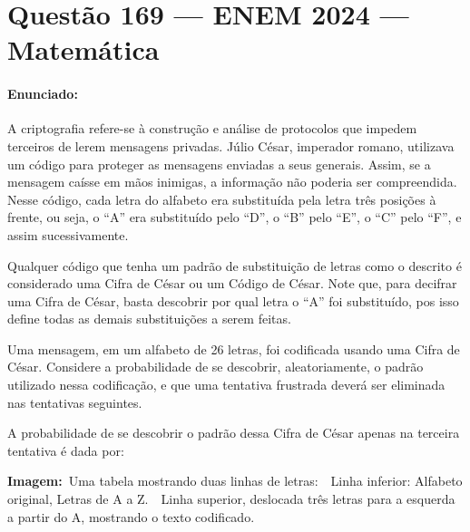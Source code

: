 \documentclass[a4paper,12pt]{article}
\begin{document}
\section*{Questão 169 --- ENEM 2024 --- Matemática}

\paragraph{Enunciado:}
A criptografia refere-se à construção e análise de protocolos que impedem terceiros de lerem mensagens privadas.
Júlio César, imperador romano, utilizava um código para proteger as mensagens enviadas a seus generais. Assim,
se a mensagem caísse em mãos inimigas, a informação não poderia ser compreendida. Nesse código, cada letra do
alfabeto era substituída pela letra três posições à frente, ou seja, o ``A'' era substituído pelo ``D'', o ``B'' pelo ``E'', o ``C''
pelo ``F'', e assim sucessivamente.

Qualquer código que tenha um padrão de substituição de letras como o descrito é considerado uma Cifra de César
ou um Código de César. Note que, para decifrar uma Cifra de César, basta descobrir por qual letra o ``A'' foi substituído,
pos isso define todas as demais substituições a serem feitas.

Uma mensagem, em um alfabeto de 26 letras, foi codificada usando uma Cifra de César. Considere a probabilidade
de se descobrir, aleatoriamente, o padrão utilizado nessa codificação, e que uma tentativa frustrada deverá ser eliminada
nas tentativas seguintes.

A probabilidade de se descobrir o padrão dessa Cifra de César apenas na terceira tentativa é dada por:

\bigskip

\noindent\textbf{Imagem:}\
Uma tabela mostrando duas linhas de letras:\
\textbullet\ Linha inferior: Alfabeto original, Letras de A a Z.\
\textbullet\ Linha superior, deslocada três letras para a esquerda a partir do A, mostrando o texto codificado.

\bigskip
\end{document}
